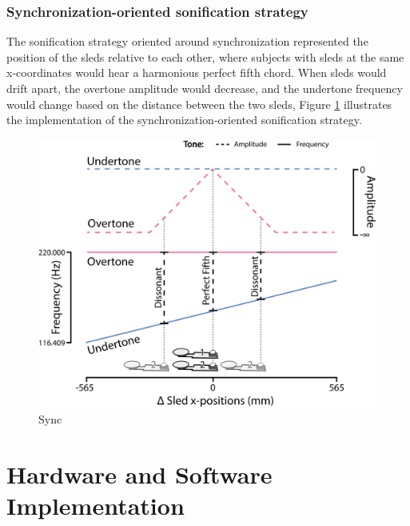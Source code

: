 \documentclass[10pt,a4paper,onecolumn]{article}
\begin{document}
\hypertarget{synchronization-oriented-sonification-strategy}{%
\subsubsection{Synchronization-oriented sonification strategy}\label{synchronization-oriented-sonification-strategy}}

The sonification strategy oriented around synchronization represented the position of the sleds relative to each other, where subjects with sleds at the same x-coordinates would hear a harmonious perfect fifth chord. When sleds would drift apart, the overtone amplitude would decrease, and the undertone frequency would change based on the distance between the two sleds, Figure \ref{fig:sync-illustration} illustrates the implementation of the synchronization-oriented sonification strategy.

\begin{figure}[h]

{\centering \includegraphics[width=1\linewidth]{figures/sync_sonif_illustration} 

}

\caption{Sync}\label{fig:sync-illustration}
\end{figure}

\hypertarget{hardware-and-software-implementation}{%
\section{Hardware and Software Implementation}\label{hardware-and-software-implementation}}
\end{document}
